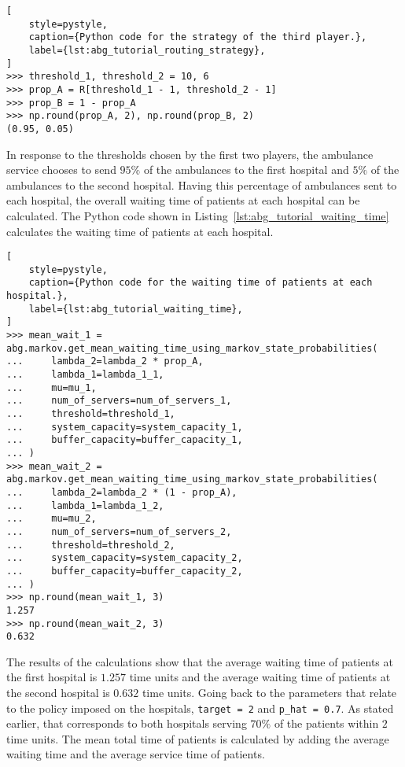\begin{lstlisting}[
    style=pystyle,
    caption={Python code for the strategy of the third player.},
    label={lst:abg_tutorial_routing_strategy},
]
>>> threshold_1, threshold_2 = 10, 6
>>> prop_A = R[threshold_1 - 1, threshold_2 - 1]
>>> prop_B = 1 - prop_A
>>> np.round(prop_A, 2), np.round(prop_B, 2)
(0.95, 0.05)

\end{lstlisting}

In response to the thresholds chosen by the first two players, the ambulance
service chooses to send \(95\%\) of the ambulances to the first hospital and
\(5\%\) of the ambulances to the second hospital.
Having this percentage of ambulances sent to each hospital, the overall waiting
time of patients at each hospital can be calculated.
The Python code shown in Listing~\ref{lst:abg_tutorial_waiting_time} calculates
the waiting time of patients at each hospital.

\begin{lstlisting}[
    style=pystyle,
    caption={Python code for the waiting time of patients at each hospital.},
    label={lst:abg_tutorial_waiting_time},
]
>>> mean_wait_1 = abg.markov.get_mean_waiting_time_using_markov_state_probabilities(
...     lambda_2=lambda_2 * prop_A,
...     lambda_1=lambda_1_1,
...     mu=mu_1,
...     num_of_servers=num_of_servers_1,
...     threshold=threshold_1,
...     system_capacity=system_capacity_1,
...     buffer_capacity=buffer_capacity_1,
... )
>>> mean_wait_2 = abg.markov.get_mean_waiting_time_using_markov_state_probabilities(
...     lambda_2=lambda_2 * (1 - prop_A),
...     lambda_1=lambda_1_2,
...     mu=mu_2,
...     num_of_servers=num_of_servers_2,
...     threshold=threshold_2,
...     system_capacity=system_capacity_2,
...     buffer_capacity=buffer_capacity_2,
... )
>>> np.round(mean_wait_1, 3)
1.257
>>> np.round(mean_wait_2, 3)
0.632

\end{lstlisting}

The results of the calculations show that the average waiting time of patients
at the first hospital is \(1.257\) time units and the average waiting time of
patients at the second hospital is \(0.632\) time units.
Going back to the parameters that relate to the policy imposed on the hospitals,
\texttt{target = 2} and \texttt{p\_hat = 0.7}.
As stated earlier, that corresponds to both hospitals serving \(70\%\) of the
patients within \(2\) time units.
The mean total time of patients is calculated by adding the average waiting
time and the average service time of patients.

